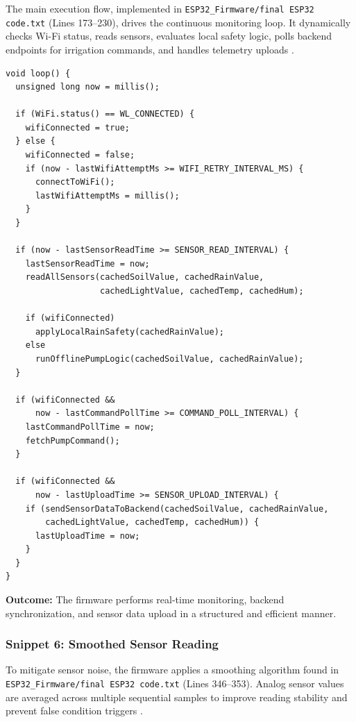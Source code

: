 The main execution flow, implemented in \texttt{ESP32\_Firmware/final ESP32 code.txt} (Lines 173--230), drives the continuous monitoring loop. It dynamically checks 
Wi-Fi status, reads sensors, evaluates local safety logic, polls 
backend endpoints for irrigation commands, and handles telemetry uploads \cite{emon2025iot}.

\begin{lstlisting}
void loop() {
  unsigned long now = millis();

  if (WiFi.status() == WL_CONNECTED) {
    wifiConnected = true;
  } else {
    wifiConnected = false;
    if (now - lastWifiAttemptMs >= WIFI_RETRY_INTERVAL_MS) {
      connectToWiFi();
      lastWifiAttemptMs = millis();
    }
  }

  if (now - lastSensorReadTime >= SENSOR_READ_INTERVAL) {
    lastSensorReadTime = now;
    readAllSensors(cachedSoilValue, cachedRainValue,
                   cachedLightValue, cachedTemp, cachedHum);

    if (wifiConnected)
      applyLocalRainSafety(cachedRainValue);
    else
      runOfflinePumpLogic(cachedSoilValue, cachedRainValue);
  }

  if (wifiConnected &&
      now - lastCommandPollTime >= COMMAND_POLL_INTERVAL) {
    lastCommandPollTime = now;
    fetchPumpCommand();
  }

  if (wifiConnected &&
      now - lastUploadTime >= SENSOR_UPLOAD_INTERVAL) {
    if (sendSensorDataToBackend(cachedSoilValue, cachedRainValue,
        cachedLightValue, cachedTemp, cachedHum)) {
      lastUploadTime = now;
    }
  }
}
\end{lstlisting}

\textbf{Outcome:} The firmware performs real-time monitoring, 
backend synchronization, and sensor data upload in a structured 
and efficient manner.

\subsubsection{Snippet 6: Smoothed Sensor Reading}
\label{subsec:snippet6}

To mitigate sensor noise, the firmware applies a smoothing algorithm found in \texttt{ESP32\_Firmware/final ESP32 code.txt} (Lines 346--353). Analog sensor values are averaged across multiple sequential samples to improve reading stability and prevent false condition triggers \cite{noisyiot2023}.


